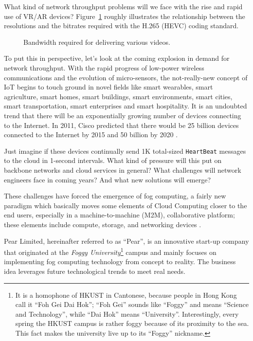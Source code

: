 What kind of network throughput problems will we face with the rise and rapid use of VR/AR devices? Figure~\ref{fig:bitrate-resolution} roughly illustrates the relationship between the resolutions and the bitrates required with the H.265 (HEVC) coding standard. 

\begin{figure}[ht]
	\centering
	
	\caption{Bandwidth required for delivering various videos.}\label{fig:bitrate-resolution}
\end{figure}

To put this in perspective, let's look at the coming explosion in demand for network throughput. With the rapid progress of low-power wireless communications and the evolution of micro-sensors, the not-really-new concept of IoT begins to touch ground in novel fields like smart wearables, smart agriculture, smart homes, smart buildings, smart environments, smart cities, smart transportation, smart enterprises and smart hospitality. It is an undoubted trend that there will be an exponentially growing number of devices connecting to the Internet. 
In 2011, Cisco predicted that there would be 25 billion devices connected to the Internet by 2015 and 50 billion by 2020 \cite{evans2011internet}. 

Just imagine if these devices continually send 1K total-sized \texttt{HeartBeat} messages to the cloud in 1-second intervals. 
What kind of pressure will this put on backbone networks and cloud services in general? What challenges will network engineers face in coming years? And what new solutions will emerge? 

These challenges have forced the emergence of fog computing, a fairly new paradigm which basically moves some elements of Cloud Computing closer to the end users, especially in a machine-to-machine (M2M), collaborative platform; these elements include compute, storage, and networking devices \cite{Bonomi:2012:Fog:IoT}. 

Pear Limited, hereinafter referred to as ``Pear'', is an innovative start-up company that originated at the \emph{Foggy University}\footnote{It is a homophone of HKUST in Cantonese, because people in Hong Kong call it ``Foh Gei Dai Hok''; ``Foh Gei'' sounds like ``Foggy'' and means ``Science and Technology'', while ``Dai Hok'' means ``University''. Interestingly, every spring the HKUST campus is rather foggy because of its proximity to the sea. This fact makes the university live up to its ``Foggy'' nickname.} campus and mainly focuses on implementing fog computing technology from concept to reality. The business idea leverages future technological trends to meet real needs. 

